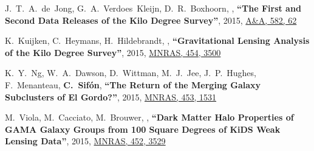 \documentclass{article}
\def\myself{\textbf{\color{red} C.~Sif\'on}}
\def\aap{A\&A}
\def\mnras{MNRAS}
\begin{document}
\begin{etaremune}
\item
J.~T.~A.~de~Jong, G.~A.~Verdoes~Kleijn, D.~R.~Boxhoorn, ,
\textbf{``The First and Second Data Releases of the Kilo Degree Survey''},
2015, \href{http://adsabs.harvard.edu/abs/2015A&A...582A..62D}{\aap, 582, 62}

\item
K.~Kuijken, C.~Heymans, H.~Hildebrandt, ,
\textbf{``Gravitational Lensing Analysis of the Kilo Degree Survey''},
2015, \href{http://adsabs.harvard.edu/abs/2015MNRAS.454.3500K}{\mnras, 454, 3500}

\item
K.~Y.~Ng, W.~A.~Dawson, D.~Wittman, M.~J.~Jee, J.~P.~Hughes, F.~Menanteau, \myself,
\textbf{``The Return of the Merging Galaxy Subclusters of El Gordo?''},
2015, \href{http://adsabs.harvard.edu/abs/2015MNRAS.453.1531N}{\mnras, 453, 1531}

\item
M.~Viola, M.~Cacciato, M.~Brouwer, ,
\textbf{``Dark Matter Halo Properties of GAMA Galaxy Groups from 100 Square Degrees of KiDS Weak 
Lensing Data''},
2015, \href{http://adsabs.harvard.edu/adsabs/abs/2015MNRAS.452.3528V}{\mnras, 452, 3529}


\end{etaremune}
\end{document}
